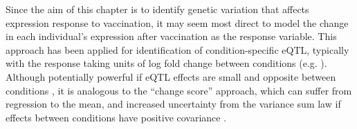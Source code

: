 Since the aim of this chapter is to identify genetic variation that affects expression response to vaccination, it may seem most direct to model the change in each individual's expression after vaccination as the response variable.
This approach has been applied for identification of condition-specific \gls{eQTL}, typically with the response taking units of log fold change between conditions (e.g. \autocite{maranville2011InteractionsGlucocorticoidTreatment,ackermann2013ImpactNaturalGenetic,shpak2014EQTLAnalysisHuman}).
Although potentially powerful if \gls{eQTL} effects are small and opposite between conditions \autocite{ackermann2013ImpactNaturalGenetic}, 
it is analogous to the \enquote{change score} approach, which can suffer from regression to the mean, and increased uncertainty from the variance sum law if effects between conditions have positive covariance \autocite{allison1990ChangeScoresDependent,clifton2019CorrelationBaselineScore}.
%
%
%
%
